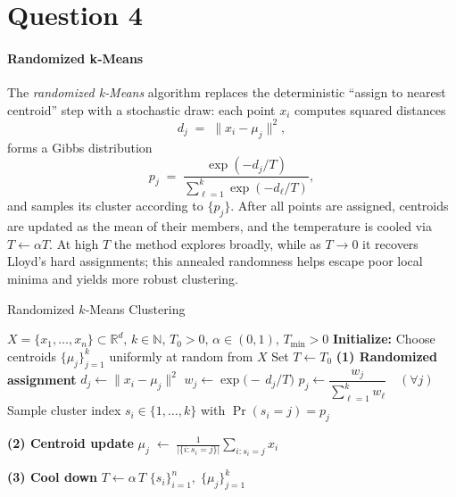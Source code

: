 \documentclass{article}
\begin{document}
\section{Question 4}

\paragraph{Randomized k‑Means}
The \emph{randomized k‑Means} algorithm replaces the deterministic “assign to nearest centroid” step with a stochastic draw: each point \(x_i\) computes squared distances 
\[
d_j \;=\;\|x_i - \mu_j\|^2,
\]
forms a Gibbs distribution
\[
p_j \;=\;\frac{\exp(-d_j/T)}{\sum_{\ell=1}^k \exp(-d_\ell/T)},
\]
and samples its cluster according to \(\{p_j\}\). After all points are assigned, centroids are updated as the mean of their members, and the temperature is cooled via \(T\leftarrow\alpha T\). At high \(T\) the method explores broadly, while as \(T\to0\) it recovers Lloyd’s hard assignments; this annealed randomness helps escape poor local minima and yields more robust clustering.


\begin{algorithm}[ht]
\caption{Randomized $k$‑Means Clustering}
\label{alg:rand-kmeans}
\begin{algorithmic}[1]
\Require $X = \{x_1,\dots,x_n\}\subset\mathbb R^d$, \quad
         $k\in\mathbb N$, \quad
         $T_0>0$, \quad
         $\alpha\in(0,1)$, \quad
         $T_{\min}>0$
\State \textbf{Initialize:} 
\Statex \quad Choose centroids $\{\mu_j\}_{j=1}^k$ uniformly at random from $X$
\Statex \quad Set $T \gets T_0$
  \State \textbf{(1) Randomized assignment}
      \State $d_j \gets \|x_i - \mu_j\|^2$
      \State $w_j \gets \exp\bigl(-\,d_j / T\bigr)$
    \EndFor
    \State $p_j \gets \dfrac{w_j}{\sum_{\ell=1}^k w_\ell}
      \quad(\forall j)$
    \State Sample cluster index $s_i\in\{1,\dots,k\}$ with $\Pr(s_i=j)=p_j$
  \EndFor

  \State \textbf{(2) Centroid update}
    \State $\displaystyle
      \mu_j \;\gets\;
      \frac{1}{\bigl|\{i:s_i=j\}\bigr|}\sum_{i: s_i=j} x_i$
  \EndFor

  \State \textbf{(3) Cool down}
  \State $T \gets \alpha\,T$
\EndWhile
\State \Return $\{s_i\}_{i=1}^n,\;\{\mu_j\}_{j=1}^k$
\end{algorithmic}
\end{algorithm}
\end{document}
